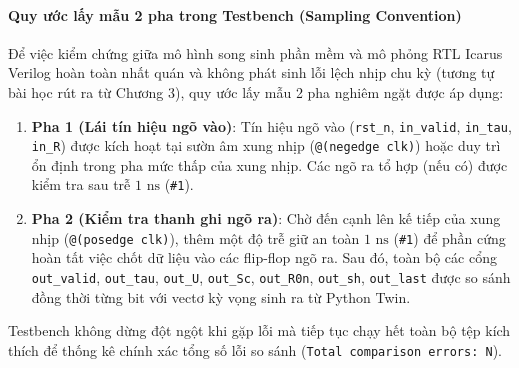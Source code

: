 \paragraph{Quy ước lấy mẫu 2 pha trong Testbench (Sampling Convention)}
Để việc kiểm chứng giữa mô hình song sinh phần mềm và mô phỏng RTL Icarus Verilog hoàn toàn nhất quán và không phát sinh lỗi lệch nhịp chu kỳ (tương tự bài học rút ra từ Chương 3), quy ước lấy mẫu 2 pha nghiêm ngặt được áp dụng:
\begin{enumerate}[leftmargin=1.5em]
    \item \textbf{Pha 1 (Lái tín hiệu ngõ vào)}: Tín hiệu ngõ vào (\texttt{rst\_n}, \texttt{in\_valid}, \texttt{in\_tau}, \texttt{in\_R}) được kích hoạt tại sườn âm xung nhịp (\texttt{@(negedge clk)}) hoặc duy trì ổn định trong pha mức thấp của xung nhịp. Các ngõ ra tổ hợp (nếu có) được kiểm tra sau trễ $1\text{ ns}$ (\texttt{\#1}).
    \item \textbf{Pha 2 (Kiểm tra thanh ghi ngõ ra)}: Chờ đến cạnh lên kế tiếp của xung nhịp (\texttt{@(posedge clk)}), thêm một độ trễ giữ an toàn $1\text{ ns}$ (\texttt{\#1}) để phần cứng hoàn tất việc chốt dữ liệu vào các flip-flop ngõ ra. Sau đó, toàn bộ các cổng \texttt{out\_valid}, \texttt{out\_tau}, \texttt{out\_U}, \texttt{out\_Sc}, \texttt{out\_R0n}, \texttt{out\_sh}, \texttt{out\_last} được so sánh đồng thời từng bit với vectơ kỳ vọng sinh ra từ Python Twin.
\end{enumerate}
Testbench không dừng đột ngột khi gặp lỗi mà tiếp tục chạy hết toàn bộ tệp kích thích để thống kê chính xác tổng số lỗi so sánh (\texttt{Total comparison errors: N}).

